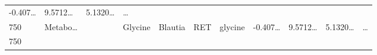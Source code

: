 \documentclass[
]{article}
\begin{document}
\begin{longtable}[]{@{}lllllllllll@{}}
\begin{minipage}[t]{0.07\columnwidth}
-0.407\ldots{}\strut
\end{minipage} & \begin{minipage}[t]{0.07\columnwidth}\raggedright
9.5712\ldots{}\strut
\end{minipage} & \begin{minipage}[t]{0.07\columnwidth}\raggedright
5.1320\ldots{}\strut
\end{minipage} & \begin{minipage}[t]{0.03\columnwidth}\raggedright
\ldots{}\strut
\end{minipage}\tabularnewline
\begin{minipage}[t]{0.03\columnwidth}\raggedright
750\strut
\end{minipage} & \begin{minipage}[t]{0.07\columnwidth}\raggedright
Metabo\ldots{}\strut
\end{minipage} & \begin{minipage}[t]{0.07\columnwidth}\raggedright
\strut
\end{minipage} & \begin{minipage}[t]{0.09\columnwidth}\raggedright
Glycine\strut
\end{minipage} & \begin{minipage}[t]{0.07\columnwidth}\raggedright
Blautia\strut
\end{minipage} & \begin{minipage}[t]{0.07\columnwidth}\raggedright
RET\strut
\end{minipage} & \begin{minipage}[t]{0.09\columnwidth}\raggedright
glycine\strut
\end{minipage} & \begin{minipage}[t]{0.07\columnwidth}\raggedright
-0.407\ldots{}\strut
\end{minipage} & \begin{minipage}[t]{0.07\columnwidth}\raggedright
9.5712\ldots{}\strut
\end{minipage} & \begin{minipage}[t]{0.07\columnwidth}\raggedright
5.1320\ldots{}\strut
\end{minipage} & \begin{minipage}[t]{0.03\columnwidth}\raggedright
\ldots{}\strut
\end{minipage}\tabularnewline
\begin{minipage}[t]{0.03\columnwidth}\raggedright
750\strut
\end{minipage} & \begin{minipage}[t]{0.07\columnwidth}\raggedright

\end{minipage}
\end{longtable}
\end{document}
